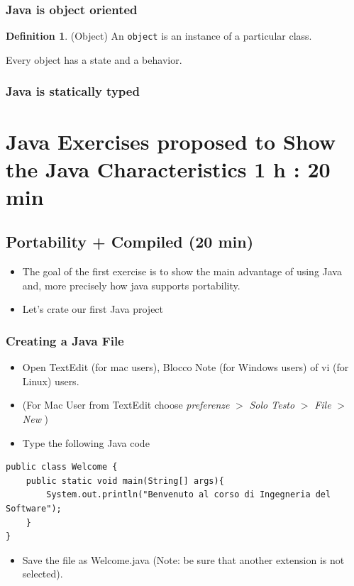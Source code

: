 \documentclass{article}
\theoremstyle{definition}
\newtheorem{mydef}{Definition}
\begin{document}
\subsubsection{Java is object oriented}
\begin{mydef} (Object) An \texttt{object} is an instance of a particular class.
\end{mydef}

Every object has a state and a behavior.

\subsubsection{Java is statically typed}

\section{Java Exercises proposed to Show the Java Characteristics 1 h : 20 min}
\subsection{Portability + Compiled (20 min)}
\begin{itemize}
\item The goal of the first exercise is to show the main advantage of using Java and, more precisely how java supports portability.
\item Let's crate our first Java project
\end{itemize}

\subsubsection{Creating a Java File}
\begin{itemize}
\item Open TextEdit (for mac users), Blocco Note (for Windows users) of vi (for Linux) users.
\item (For Mac User from TextEdit choose \textit{preferenze} $>$ \textit{Solo Testo} $>$ \textit{File} $>$ \textit{New} )
\item Type the following Java code
\end{itemize}
\begin{lstlisting}
public class Welcome {	
    public static void main(String[] args){	
	 	System.out.println("Benvenuto al corso di Ingegneria del Software");
    }
}
\end{lstlisting}
\begin{itemize}
\item Save the file as Welcome.java (Note: be sure that another extension is not selected).
\end{itemize}
\end{document}
